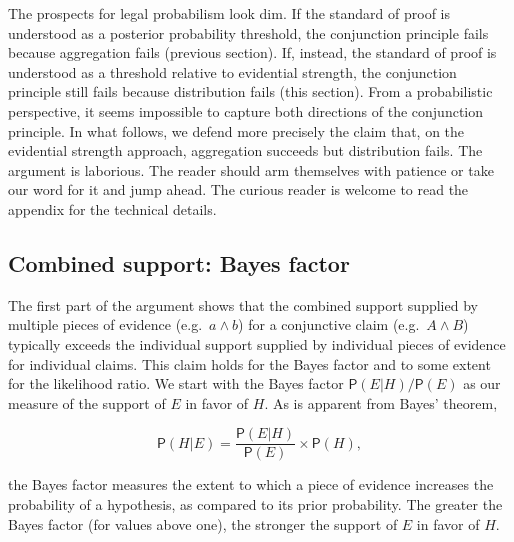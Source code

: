 \documentclass[
  10pt,
  dvipsnames,enabledeprecatedfontcommands]{scrartcl}
\newcommand{\pr}[1]{\ensuremath{\mathsf{P}(#1)}}
\begin{document}
The prospects for legal probabilism look dim. If the standard of proof
is understood as a posterior probability threshold, the conjunction
principle fails because aggregation fails (previous section). If,
instead, the standard of proof is understood as a threshold relative to
evidential strength, the conjunction principle still fails because
distribution fails (this section). From a probabilistic perspective, it
seems impossible to capture both directions of the conjunction
principle. In what follows, we defend more precisely the claim that, on
the evidential strength approach, aggregation succeeds but distribution
fails. The argument is laborious. The reader should arm themselves with
patience or take our word for it and jump ahead. The curious reader is
welcome to read the appendix for the technical details.

\hypertarget{combined-support-bayes-factor}{%
\subsection{Combined support: Bayes
factor}\label{combined-support-bayes-factor}}

The first part of the argument shows that the combined support supplied
by multiple pieces of evidence (e.g.~\(a\wedge b\)) for a conjunctive
claim (e.g.~\(A\wedge B\)) typically exceeds the individual support
supplied by individual pieces of evidence for individual claims. This
claim holds for the Bayes factor and to some extent for the likelihood
ratio. We start with the Bayes factor \(\pr{E \vert H}/\pr{E}\) as our
measure of the support of \(E\) in favor of \(H\). As is apparent from
Bayes' theorem,

\[\pr{H \vert E} = \frac{\pr{E \vert H}}{\pr{E}}\times \pr{H},\]

\noindent the Bayes factor measures the extent to which a piece of
evidence increases the probability of a hypothesis, as compared to its
prior probability. The greater the Bayes factor (for values above one),
the stronger the support of \(E\) in favor of \(H\).
\end{document}
